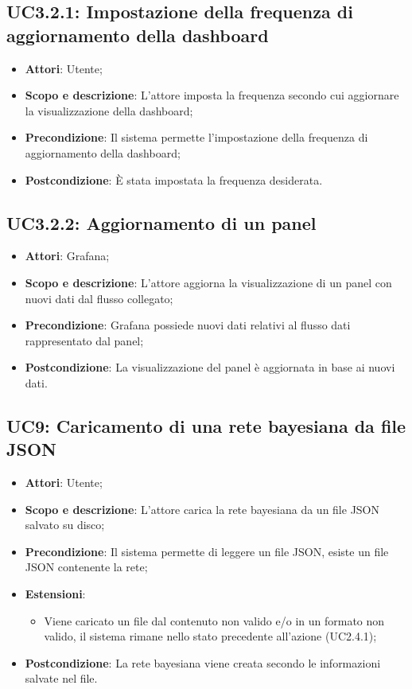 \subsection{UC3.2.1: Impostazione della frequenza di aggiornamento della dashboard}
\hypertarget{UC3.2.1}{}
\begin{itemize}
	\item \textbf{Attori}: Utente;
	\item \textbf{Scopo e descrizione}: L'attore imposta la frequenza secondo cui aggiornare la visualizzazione della dashboard;
	\item \textbf{Precondizione}: Il sistema permette l'impostazione della frequenza di aggiornamento della dashboard;
	\item \textbf{Postcondizione}: È stata impostata la frequenza desiderata.
\end{itemize}

\subsection{UC3.2.2: Aggiornamento di un panel}
\hypertarget{UC3.2.2}{}
\begin{itemize}
	\item \textbf{Attori}: Grafana;
	\item \textbf{Scopo e descrizione}: L'attore aggiorna la visualizzazione di un panel con nuovi dati dal flusso collegato;
	\item \textbf{Precondizione}: Grafana possiede nuovi dati relativi al flusso dati rappresentato dal panel;
	\item \textbf{Postcondizione}: La visualizzazione del panel è aggiornata in base ai nuovi dati.
\end{itemize}

\subsection{UC9: Caricamento di una rete bayesiana da file JSON}
\hypertarget{UC9}{}
\begin{itemize}
	\item \textbf{Attori}: Utente;
	\item \textbf{Scopo e descrizione}: L'attore carica la rete bayesiana da un file JSON salvato su disco;
	\item \textbf{Precondizione}: Il sistema permette di leggere un file JSON, esiste un file JSON contenente la rete;
	\item \textbf{Estensioni}:
	\begin{itemize}
		\item Viene caricato un file dal contenuto non valido e/o in un formato non valido, il sistema rimane nello stato precedente all'azione (UC2.4.1);
	\end{itemize}
	\item \textbf{Postcondizione}: La rete bayesiana viene creata secondo le informazioni salvate nel file.
\end{itemize}
